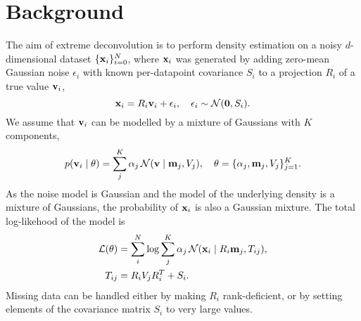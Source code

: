 \section{Background}

The aim of extreme deconvolution is to perform density estimation on a noisy $d$-dimensional dataset $\{\mathbf{x}_i\}_{i=0}^N$, where $\mathbf{x}_i$ was generated by adding zero-mean Gaussian noise $\epsilon_i$ with known per-datapoint covariance $S_i$ to a projection $R_i$ of a true value $\mathbf{v}_i$,
\begin{equation}
  \mathbf{x}_i = R_i\mathbf{v}_i + \epsilon_i,\quad  \epsilon_i \sim \mathcal{N}(\mathbf{0}, S_i).
\end{equation}
We assume that $\mathbf{v}_i$ can be modelled by a mixture of Gaussians with $K$ components,
\begin{equation}
p(\mathbf{v}_i \mid \theta) = \sum_j^K \alpha_j \,\mathcal{N}(\mathbf{v} \mid \mathbf{m}_j, V_j), \quad \theta = \{\alpha_j, \mathbf{m}_j, V_j\}_{j=1} ^ K.
\end{equation}
As the noise model is Gaussian and the model of the underlying density is a mixture of Gaussians, the probability of $\mathbf{x}_i$ is also a Gaussian mixture.
The total log-likehood of the model is
\begin{align}
\mathcal{L}(\theta) &= \sum_i^N \log \sum_j^K \alpha_j\,\mathcal{N}(\mathbf{x}_i \mid R_i\mathbf{m}_j, T_{ij}), \\
T_{ij} &= R_iV_jR_i^T + S_i.
\end{align}
Missing data can be handled either by making $R_i$ rank-deficient, or by setting elements of the covariance matrix $S_i$ to very large values.
